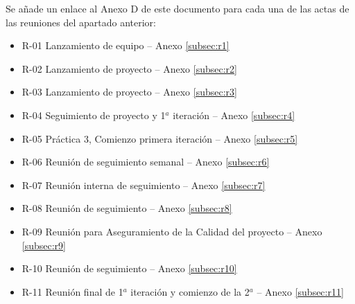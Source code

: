 Se añade un enlace al Anexo D de este documento para cada una de las actas de las reuniones del apartado anterior:
\begin{itemize}
\item R-01 Lanzamiento de equipo -- Anexo \ref{subsec:r1}
\item R-02 Lanzamiento de proyecto -- Anexo \ref{subsec:r2}
\item R-03 Lanzamiento de proyecto -- Anexo \ref{subsec:r3}
\item R-04 Seguimiento de proyecto y 1$^a$ iteración -- Anexo \ref{subsec:r4}
\item R-05 Práctica 3, Comienzo primera iteración -- Anexo \ref{subsec:r5}
\item R-06 Reunión de seguimiento semanal -- Anexo \ref{subsec:r6}
\item R-07 Reunión interna de seguimiento -- Anexo \ref{subsec:r7}
\item R-08 Reunión de seguimiento -- Anexo \ref{subsec:r8}
\item R-09 Reunión para Aseguramiento de la Calidad del proyecto -- Anexo \ref{subsec:r9}
\item R-10 Reunión de seguimiento -- Anexo \ref{subsec:r10}
\item R-11 Reunión final de 1$^a$ iteración y comienzo de la 2$^a$ -- Anexo \ref{subsec:r11}
\end{itemize}